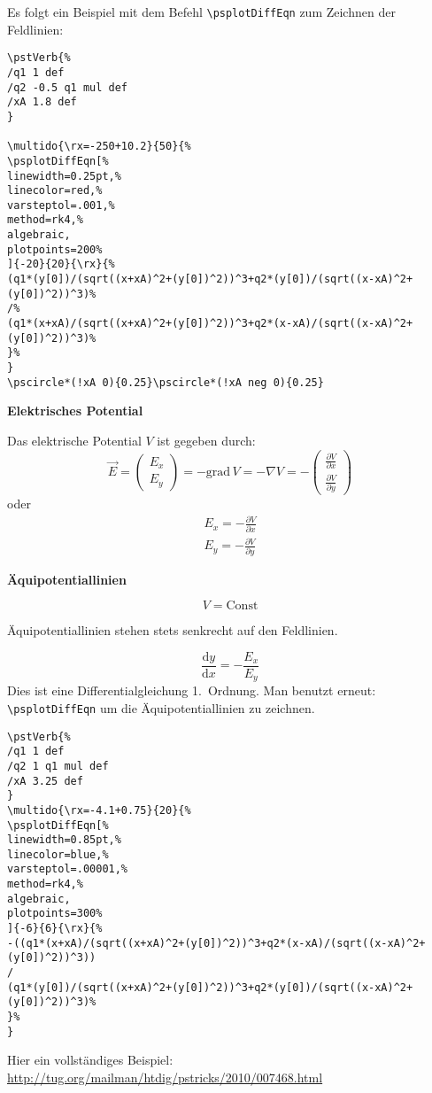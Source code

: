 \documentclass[11pt,english,ngerman,BCOR10mm,DIV12,bibliography=totoc,parskip=false,smallheadings
    headexclude,footexclude,oneside]{pst-doc}
\begin{document}
Es folgt ein Beispiel mit dem Befehl \verb!\psplotDiffEqn! zum Zeichnen der Feldlinien:
\begin{verbatim}
\pstVerb{%
/q1 1 def
/q2 -0.5 q1 mul def
/xA 1.8 def
}

\multido{\rx=-250+10.2}{50}{%
\psplotDiffEqn[%
linewidth=0.25pt,%
linecolor=red,%
varsteptol=.001,%
method=rk4,%
algebraic,
plotpoints=200%
]{-20}{20}{\rx}{%
(q1*(y[0])/(sqrt((x+xA)^2+(y[0])^2))^3+q2*(y[0])/(sqrt((x-xA)^2+(y[0])^2))^3)%
/%
(q1*(x+xA)/(sqrt((x+xA)^2+(y[0])^2))^3+q2*(x-xA)/(sqrt((x-xA)^2+(y[0])^2))^3)%
}%
}
\pscircle*(!xA 0){0.25}\pscircle*(!xA neg 0){0.25}
\end{verbatim}



\textbf{Elektrisches Potential}

Das elektrische Potential $V$ ist gegeben durch:
\begin{equation}
\vec{E}=\begin{pmatrix}
E_x\\E_y
\end{pmatrix}=-\text{grad}\, V=-\nabla V =-\begin{pmatrix}
\frac{\partial V}{\partial x}\\[4pt]
\frac{\partial V}{\partial y}
\end{pmatrix}
\end{equation}
oder
\begin{align*}
E_x=-\frac{\partial V}{\partial x}\\
E_y=-\frac{\partial V}{\partial y}
\end{align*}

\textbf{\"{A}quipotentiallinien}

\begin{equation*}
V=\text{Const}
\end{equation*}

\"{A}quipotentiallinien stehen stets senkrecht auf den Feldlinien.

\begin{equation*}
\frac{\text{d}y}{\text{d}x}=-\frac{E_x}{E_y}
\end{equation*}
Dies ist eine Differentialgleichung 1.~Ordnung. Man benutzt erneut: \verb!\psplotDiffEqn! um die \"{A}quipotentiallinien zu zeichnen.
\begin{verbatim}
\pstVerb{%
/q1 1 def
/q2 1 q1 mul def
/xA 3.25 def
}
\multido{\rx=-4.1+0.75}{20}{%
\psplotDiffEqn[%
linewidth=0.85pt,%
linecolor=blue,%
varsteptol=.00001,%
method=rk4,%
algebraic,
plotpoints=300%
]{-6}{6}{\rx}{%
-((q1*(x+xA)/(sqrt((x+xA)^2+(y[0])^2))^3+q2*(x-xA)/(sqrt((x-xA)^2+(y[0])^2))^3))
/
(q1*(y[0])/(sqrt((x+xA)^2+(y[0])^2))^3+q2*(y[0])/(sqrt((x-xA)^2+(y[0])^2))^3)%
}%
}
\end{verbatim}
Hier ein vollst\"{a}ndiges Beispiel: \url{http://tug.org/mailman/htdig/pstricks/2010/007468.html}
\end{document}
